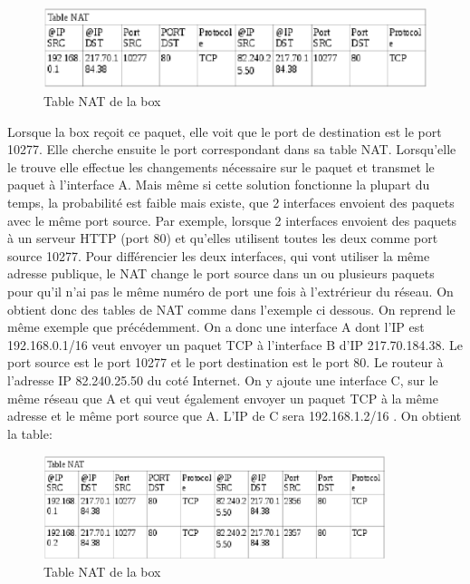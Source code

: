 \begin{figure}[h]
\centering
\includegraphics[width=12cm]{./pics/TableNAT1.eps}
\caption{Table NAT de la box}
\label{fig:NAT1}
\end{figure}

Lorsque la box reçoit ce paquet, elle voit que le port de destination est le
port 10277. Elle cherche ensuite le port correspondant dans sa table NAT.
Lorsqu'elle le trouve elle effectue les changements nécessaire sur le paquet et
transmet le paquet à l'interface A.
\newline
Mais même si cette solution fonctionne la plupart du temps, la probabilité est
faible mais existe, que 2 interfaces envoient des paquets avec le même port
source. Par exemple, lorsque 2 interfaces envoient des paquets à un serveur
HTTP (port 80) et qu'elles utilisent toutes les deux comme port source 10277.
Pour différencier les deux interfaces, qui vont utiliser la même adresse
publique, le NAT change le port source dans un ou plusieurs paquets pour qu'il
n'ai pas le même numéro de port une fois à l'extrérieur du réseau.  On obtient
donc des tables de NAT comme dans l'exemple ci dessous.
\newline
On reprend le même exemple que précédemment. On a donc une interface A dont l'IP
est 192.168.0.1/16 veut envoyer un paquet TCP à l'interface B d'IP 217.70.184.38.
Le port source est le port 10277 et le port destination est le port 80. Le
routeur à l'adresse IP  82.240.25.50 du coté Internet.
On y ajoute une interface C, sur le même réseau que A et qui veut également
envoyer un paquet TCP à la même adresse et le même port source que A. L'IP de C
sera 192.168.1.2/16 .
On obtient la table:

\begin{figure}[h]
\centering
\includegraphics[width=10cm]{./pics/TableNAT2.eps}
\caption{Table NAT de la box}
\label{fig:NAT2}
\end{figure}

